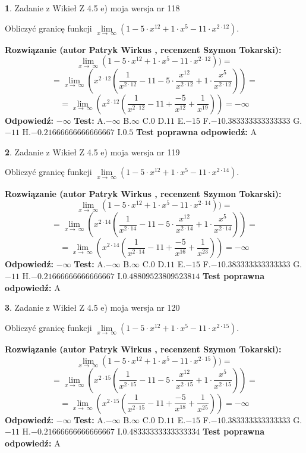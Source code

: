 \documentclass[12pt, a4paper]{article}
\theoremstyle{definition} %
\newtheorem{zad}{}
\newcommand{\zadStart}[1]{\begin{zad}#1\newline}
\newcommand{\zadStop}{\end{zad}}
\newcommand{\rozwStart}[2]{\noindent \textbf{Rozwiązanie (autor #1 , recenzent #2): }\newline}
\newcommand{\rozwStop}{\newline}
\newcommand{\odpStart}{\noindent \textbf{Odpowiedź:}\newline}
\newcommand{\odpStop}{\newline}
\newcommand{\testStart}{\noindent \textbf{Test:}\newline}
\newcommand{\testStop}{\newline}
\newcommand{\kluczStart}{\noindent \textbf{Test poprawna odpowiedź:}\newline}
\newcommand{\kluczStop}{\newline}
\begin{document}
\zadStart{Zadanie z Wikieł Z 4.5 e) moja wersja nr 118}


Obliczyć granicę funkcji  $\lim\limits_{x\to\ \infty}(1 - 5 \cdot x^{12}+1 \cdot x^{5}- 11 \cdot x^{2\cdot12})$.
\zadStop
\rozwStart{Patryk Wirkus}{Szymon Tokarski}
$$\lim\limits_{x\to\ \infty}(1 - 5 \cdot x^{12}+1 \cdot x^{5}- 11 \cdot x^{2\cdot12}))=$$
$$=\lim\limits_{x\to\ \infty}(x^{2\cdot12}(\frac{1}{x^{2\cdot12}}-11 -5 \cdot \frac{x^{12}}{x^{2\cdot12}}+1 \cdot \frac{x^{5}}{x^{2\cdot12}}))=$$
$$=\lim\limits_{x\to\ \infty}(x^{2\cdot12}(\frac{1}{x^{2\cdot12}}-11 + \frac{-5}{x^{12}}+ \frac{1}{x^{19}}))=-\infty$$
\rozwStop
\odpStart
$-\infty$
\odpStop
\testStart
A.$-\infty$ B.$\infty$ C.$0$ D.$11$ E.$-15$
F.$-10.383333333333333$ G.$-11$
H.$-0.21666666666666667$
I.$0.5$
\testStop
\kluczStart
A
\kluczStop



\zadStart{Zadanie z Wikieł Z 4.5 e) moja wersja nr 119}


Obliczyć granicę funkcji  $\lim\limits_{x\to\ \infty}(1 - 5 \cdot x^{12}+1 \cdot x^{5}- 11 \cdot x^{2\cdot14})$.
\zadStop
\rozwStart{Patryk Wirkus}{Szymon Tokarski}
$$\lim\limits_{x\to\ \infty}(1 - 5 \cdot x^{12}+1 \cdot x^{5}- 11 \cdot x^{2\cdot14}))=$$
$$=\lim\limits_{x\to\ \infty}(x^{2\cdot14}(\frac{1}{x^{2\cdot14}}-11 -5 \cdot \frac{x^{12}}{x^{2\cdot14}}+1 \cdot \frac{x^{5}}{x^{2\cdot14}}))=$$
$$=\lim\limits_{x\to\ \infty}(x^{2\cdot14}(\frac{1}{x^{2\cdot14}}-11 + \frac{-5}{x^{16}}+ \frac{1}{x^{23}}))=-\infty$$
\rozwStop
\odpStart
$-\infty$
\odpStop
\testStart
A.$-\infty$ B.$\infty$ C.$0$ D.$11$ E.$-15$
F.$-10.383333333333333$ G.$-11$
H.$-0.21666666666666667$
I.$0.48809523809523814$
\testStop
\kluczStart
A
\kluczStop



\zadStart{Zadanie z Wikieł Z 4.5 e) moja wersja nr 120}


Obliczyć granicę funkcji  $\lim\limits_{x\to\ \infty}(1 - 5 \cdot x^{12}+1 \cdot x^{5}- 11 \cdot x^{2\cdot15})$.
\zadStop
\rozwStart{Patryk Wirkus}{Szymon Tokarski}
$$\lim\limits_{x\to\ \infty}(1 - 5 \cdot x^{12}+1 \cdot x^{5}- 11 \cdot x^{2\cdot15}))=$$
$$=\lim\limits_{x\to\ \infty}(x^{2\cdot15}(\frac{1}{x^{2\cdot15}}-11 -5 \cdot \frac{x^{12}}{x^{2\cdot15}}+1 \cdot \frac{x^{5}}{x^{2\cdot15}}))=$$
$$=\lim\limits_{x\to\ \infty}(x^{2\cdot15}(\frac{1}{x^{2\cdot15}}-11 + \frac{-5}{x^{18}}+ \frac{1}{x^{25}}))=-\infty$$
\rozwStop
\odpStart
$-\infty$
\odpStop
\testStart
A.$-\infty$ B.$\infty$ C.$0$ D.$11$ E.$-15$
F.$-10.383333333333333$ G.$-11$
H.$-0.21666666666666667$
I.$0.48333333333333334$
\testStop
\kluczStart
A
\kluczStop
\end{document}

